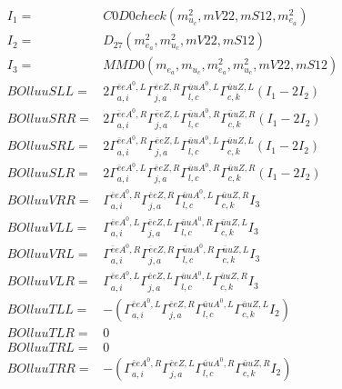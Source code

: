 \documentclass[A4,landscape]{article}
\begin{document}
\begin{align} 
I_1 = & C0D0check(m^2_{u_{{c}}}, mV22, mS12, m^2_{e_{{a}}}) \\ 
I_2 = & D_{27}(m^2_{e_{{a}}}, m^2_{u_{{c}}}, mV22, mS12) \\ 
I_3 = & MMD0(m_{e_{{a}}}, m_{u_{{c}}}, m^2_{e_{{a}}}, m^2_{u_{{c}}}, mV22, mS12) \\ 
  BOlluuSLL= & 2  \Gamma^{\bar{e}e A^0 ,L}_{a, i} \Gamma^{\bar{e}e Z ,R}_{j, a} \Gamma^{\bar{u}u A^0 ,L}_{l, c} \Gamma^{\bar{u}u Z ,L}_{c, k} (I_1 - 2 I_2) \\ 
  BOlluuSRR= & 2  \Gamma^{\bar{e}e A^0 ,R}_{a, i} \Gamma^{\bar{e}e Z ,L}_{j, a} \Gamma^{\bar{u}u A^0 ,R}_{l, c} \Gamma^{\bar{u}u Z ,R}_{c, k} (I_1 - 2 I_2) \\ 
  BOlluuSRL= & 2  \Gamma^{\bar{e}e A^0 ,R}_{a, i} \Gamma^{\bar{e}e Z ,L}_{j, a} \Gamma^{\bar{u}u A^0 ,L}_{l, c} \Gamma^{\bar{u}u Z ,L}_{c, k} (I_1 - 2 I_2) \\ 
  BOlluuSLR= & 2  \Gamma^{\bar{e}e A^0 ,L}_{a, i} \Gamma^{\bar{e}e Z ,R}_{j, a} \Gamma^{\bar{u}u A^0 ,R}_{l, c} \Gamma^{\bar{u}u Z ,R}_{c, k} (I_1 - 2 I_2) \\ 
  BOlluuVRR= &  \Gamma^{\bar{e}e A^0 ,R}_{a, i} \Gamma^{\bar{e}e Z ,R}_{j, a} \Gamma^{\bar{u}u A^0 ,L}_{l, c} \Gamma^{\bar{u}u Z ,R}_{c, k} I_3 \\ 
  BOlluuVLL= &  \Gamma^{\bar{e}e A^0 ,L}_{a, i} \Gamma^{\bar{e}e Z ,L}_{j, a} \Gamma^{\bar{u}u A^0 ,R}_{l, c} \Gamma^{\bar{u}u Z ,L}_{c, k} I_3 \\ 
  BOlluuVRL= &  \Gamma^{\bar{e}e A^0 ,R}_{a, i} \Gamma^{\bar{e}e Z ,R}_{j, a} \Gamma^{\bar{u}u A^0 ,R}_{l, c} \Gamma^{\bar{u}u Z ,L}_{c, k} I_3 \\ 
  BOlluuVLR= &  \Gamma^{\bar{e}e A^0 ,L}_{a, i} \Gamma^{\bar{e}e Z ,L}_{j, a} \Gamma^{\bar{u}u A^0 ,L}_{l, c} \Gamma^{\bar{u}u Z ,R}_{c, k} I_3 \\ 
  BOlluuTLL= & -( \Gamma^{\bar{e}e A^0 ,L}_{a, i} \Gamma^{\bar{e}e Z ,R}_{j, a} \Gamma^{\bar{u}u A^0 ,L}_{l, c} \Gamma^{\bar{u}u Z ,L}_{c, k} I_2) \\ 
  BOlluuTLR= & 0 \\ 
  BOlluuTRL= & 0 \\ 
  BOlluuTRR= & -( \Gamma^{\bar{e}e A^0 ,R}_{a, i} \Gamma^{\bar{e}e Z ,L}_{j, a} \Gamma^{\bar{u}u A^0 ,R}_{l, c} \Gamma^{\bar{u}u Z ,R}_{c, k} I_2) \\ 
\end{align} 
\end{document}
